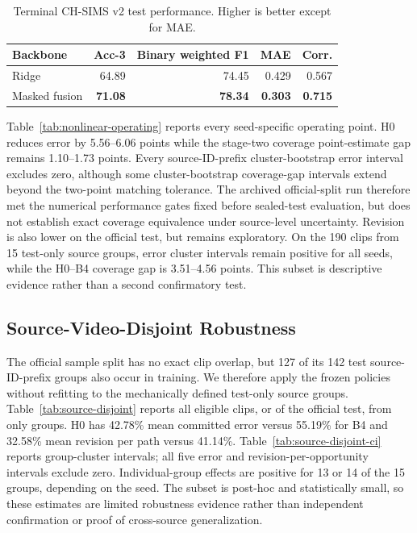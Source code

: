 \documentclass[journal]{IEEEtran}
\begin{document}
\begin{table}[t]
\centering
\caption{Terminal CH-SIMS v2 test performance. Higher is better except for MAE.}
\label{tab:nonlinear-terminal}
\small
\begin{tabular}{lrrrr}
\toprule
Backbone & Acc-3 & Binary weighted F1 & MAE & Corr. \\
\midrule
Ridge & 64.89 & 74.45 & 0.429 & 0.567 \\
Masked fusion & \textbf{71.08} & \textbf{78.34} & \textbf{0.303} & \textbf{0.715} \\
\bottomrule
\end{tabular}
\end{table}

Table~\ref{tab:nonlinear-operating} reports every seed-specific operating point. H0 reduces error by 5.56--6.06 points while the stage-two coverage point-estimate gap remains 1.10--1.73 points. Every source-ID-prefix cluster-bootstrap error interval excludes zero, although some cluster-bootstrap coverage-gap intervals extend beyond the two-point matching tolerance. The archived official-split run therefore met the numerical performance gates fixed before sealed-test evaluation, but does not establish exact coverage equivalence under source-level uncertainty. Revision is also lower on the official test, but remains exploratory. On the 190 clips from 15 test-only source groups, error cluster intervals remain positive for all seeds, while the H0--B4 coverage gap is 3.51--4.56 points. This subset is descriptive evidence rather than a second confirmatory test.



\subsection{Source-Video-Disjoint Robustness}

The official sample split has no exact clip overlap, but 127 of its 142 test source-ID-prefix groups also occur in training. We therefore apply the frozen policies without refitting to the mechanically defined test-only source groups. Table~\ref{tab:source-disjoint} reports all \SourceDisjointClips{} eligible clips, or \SourceDisjointFraction{} of the official test, from only \SourceDisjointGroups{} groups. H0 has 42.78\% mean committed error versus 55.19\% for B4 and 32.58\% mean revision per path versus 41.14\%. Table~\ref{tab:source-disjoint-ci} reports group-cluster intervals; all five error and revision-per-opportunity intervals exclude zero. Individual-group effects are positive for 13 or 14 of the 15 groups, depending on the seed. The subset is post-hoc and statistically small, so these estimates are limited robustness evidence rather than independent confirmation or proof of cross-source generalization.
\end{document}

